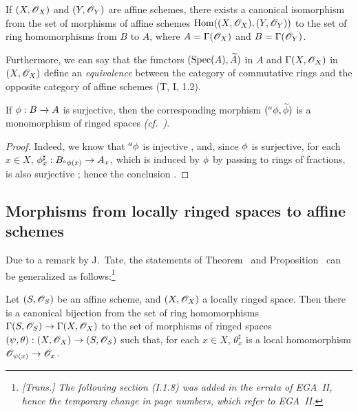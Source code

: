 \begin{corollary}[1.7.4]
\label{I.1.7.4}
If $(X,\mathscr{O}_X)$ and $(Y,\mathscr{O}_Y)$ are affine schemes, there exists a canonical isomorphism from the set of morphisms of affine schemes $\operatorname{Hom}((X,\mathscr{O}_X),(Y,\mathscr{O}_Y))$ to the set of ring homomorphisms from $B$ to $A$, where $A=\Gamma(\mathscr{O}_X)$ and $B=\Gamma(\mathscr{O}_Y)$.
\end{corollary}

Furthermore, we can say that the functors $(\operatorname{Spec}(A),\widetilde{A})$ in $A$ and $\Gamma(X,\mathscr{O}_X)$ in $(X,\mathscr{O}_X)$ define an \emph{equivalence} between the category of commutative rings and the opposite category of affine schemes (T, I, 1.2).

\begin{corollary}[1.7.5]
\label{I.1.7.5}
If $\vphi:B\to A$ is surjective, then the corresponding morphism $({}^a\phi,\widetilde{\phi})$ is a monomorphism of ringed spaces \emph{(cf.~)}.
\end{corollary}

\begin{proof}
Indeed, we know that ${}^a\phi$ is injective , and, since $\phi$ is
surjective, for each $x\in X$, $\vphi_x^\sharp:B_{{}^a\vphi(x)}\to A_x$, which is induced by $\phi$ by passing to rings of fractions, is also surjective ;
hence the conclusion .
\end{proof}

\subsection{Morphisms from locally ringed spaces to affine schemes}
\label{subsection:I.1.8}

Due to a remark by J.~Tate, the statements of Theorem~ and Proposition~ can be generalized as follows:\footnote{\emph{[Trans.] The following section (I.1.8) was added in the errata of EGA~II, hence the temporary change in page numbers, which refer to EGA~II.}}

\begin{proposition}[1.8.1]
\label{I.1.8.1}
Let $(S,\mathscr{O}_S)$ be an affine scheme, and $(X,\mathscr{O}_X)$ a locally ringed space.
Then there is a canonical bijection from the set of ring homomorphisms
$\Gamma(S,\sh{O}_S)\to\Gamma(X,\sh{O}_X)$ to the set of morphisms of ringed spaces $(\psi,\theta):(X,\sh{O}_X)\to(S,\sh{O}_S)$ such that, for each $x\in X$, $\theta_x^\sharp$ is a local homomorphism $\sh{O}_{\psi(x)}\to\sh{O}_x$.
\end{proposition}

